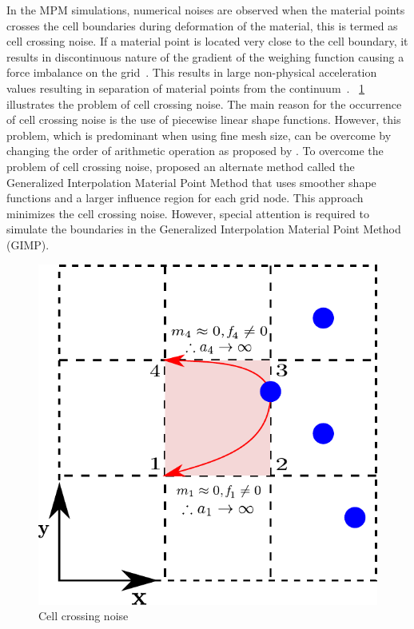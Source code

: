 In the MPM simulations, numerical noises are observed when the material points 
crosses the cell boundaries during deformation of the material, this is termed 
as cell crossing noise. If a material point is located very close to the cell 
boundary, it results in discontinuous nature of the gradient of the weighing 
function causing a force imbalance on the grid~\citep{bardenhagen2004}. This 
results in large non-physical acceleration values resulting in separation of 
material points from the continuum~\citep{Sulsky1995}. 
~\cref{fig:cellnoise} illustrates the problem of cell crossing noise. The 
main reason for the occurrence of cell crossing noise is the use of piecewise 
linear shape functions. However, this problem, which is predominant when using 
fine mesh size, can be overcome by changing the order of arithmetic operation 
as proposed by \citet{Sulsky1995}. To overcome the problem of cell crossing 
noise, \citet{bardenhagen2004} proposed an alternate method called the 
Generalized Interpolation Material Point Method that uses smoother shape 
functions and a larger influence region for each grid node. This approach 
minimizes the cell crossing noise. However, special attention is required to 
simulate the boundaries in the Generalized Interpolation Material Point Method 
(GIMP).
\begin{figure}[htbp]
\centering
\includegraphics{cellnoise}
\caption{Cell crossing noise}
\label{fig:cellnoise}
\end{figure}


